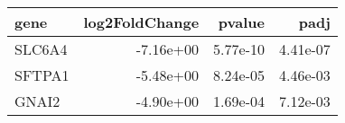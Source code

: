 \begin{tabular}{lrrr}
\toprule
  gene &  log2FoldChange &   pvalue &     padj \\
\midrule
SLC6A4 &       -7.16e+00 & 5.77e-10 & 4.41e-07 \\
SFTPA1 &       -5.48e+00 & 8.24e-05 & 4.46e-03 \\
 GNAI2 &       -4.90e+00 & 1.69e-04 & 7.12e-03 \\
\bottomrule
\end{tabular}
